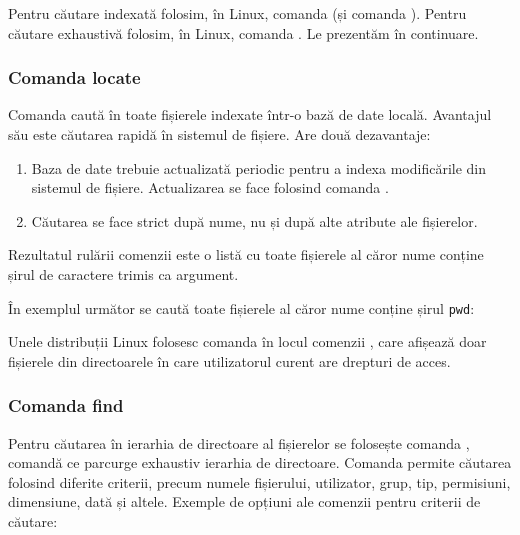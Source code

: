 Pentru căutare indexată folosim, în Linux, comanda  (și comanda ). Pentru căutare exhaustivă folosim, în Linux, comanda . Le prezentăm în continuare.

\subsubsection{Comanda locate}
\label{sec:file-system-cmd-locate}

Comanda  caută în toate fișierele indexate într-o bază de date locală. Avantajul său este căutarea rapidă în sistemul de fișiere. Are două dezavantaje:
\begin{enumerate}
  \item Baza de date trebuie actualizată periodic pentru a indexa modificările din sistemul de fișiere. Actualizarea se face folosind comanda .
  \item Căutarea se face strict după nume, nu și după alte atribute ale fișierelor.
\end{enumerate}

Rezultatul rulării comenzii este o listă cu toate fișierele al căror nume conține șirul de caractere trimis ca argument.

În exemplul următor se caută toate fișierele al căror nume conține șirul \texttt{pwd}:


Unele distribuții Linux folosesc comanda  în locul comenzii , care afișează doar fișierele din directoarele în care utilizatorul curent are drepturi de acces.

\subsubsection{Comanda find}
\label{sec:file-system-cmd-find}

Pentru căutarea în ierarhia de directoare al fișierelor se folosește comanda
, comandă ce parcurge exhaustiv ierarhia de directoare. Comanda permite căutarea folosind
diferite criterii, precum numele fișierului, utilizator, grup, tip, permisiuni,
dimensiune, dată și altele. Exemple de opțiuni ale comenzii  pentru criterii de căutare:

